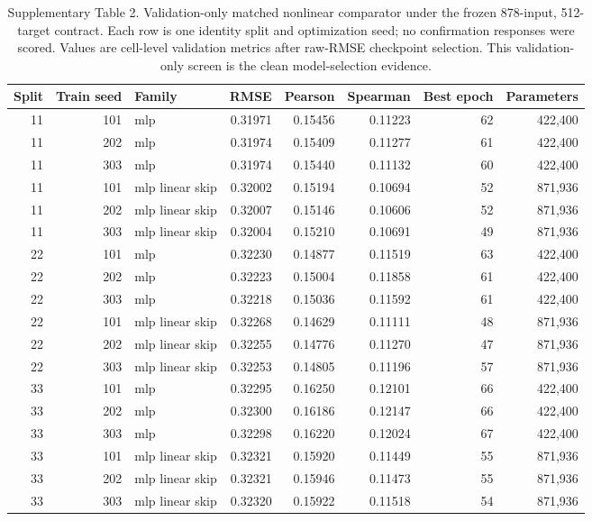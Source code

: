 \begin{table}[ht]\centering\scriptsize\caption{Supplementary Table 2. Validation-only matched nonlinear comparator under the frozen 878-input, 512-target contract. Each row is one identity split and optimization seed; no confirmation responses were scored. Values are cell-level validation metrics after raw-RMSE checkpoint selection. This validation-only screen is the clean model-selection evidence.}\label{tab:matched_nonlinear}\begin{tabular}{rrlrrrrr}\toprule Split & Train seed & Family & RMSE & Pearson & Spearman & Best epoch & Parameters \\ \midrule
11 & 101 & mlp & 0.31971 & 0.15456 & 0.11223 & 62 & 422,400 \\
11 & 202 & mlp & 0.31974 & 0.15409 & 0.11277 & 61 & 422,400 \\
11 & 303 & mlp & 0.31974 & 0.15440 & 0.11132 & 60 & 422,400 \\
11 & 101 & mlp linear skip & 0.32002 & 0.15194 & 0.10694 & 52 & 871,936 \\
11 & 202 & mlp linear skip & 0.32007 & 0.15146 & 0.10606 & 52 & 871,936 \\
11 & 303 & mlp linear skip & 0.32004 & 0.15210 & 0.10691 & 49 & 871,936 \\
22 & 101 & mlp & 0.32230 & 0.14877 & 0.11519 & 63 & 422,400 \\
22 & 202 & mlp & 0.32223 & 0.15004 & 0.11858 & 61 & 422,400 \\
22 & 303 & mlp & 0.32218 & 0.15036 & 0.11592 & 61 & 422,400 \\
22 & 101 & mlp linear skip & 0.32268 & 0.14629 & 0.11111 & 48 & 871,936 \\
22 & 202 & mlp linear skip & 0.32255 & 0.14776 & 0.11270 & 47 & 871,936 \\
22 & 303 & mlp linear skip & 0.32253 & 0.14805 & 0.11196 & 57 & 871,936 \\
33 & 101 & mlp & 0.32295 & 0.16250 & 0.12101 & 66 & 422,400 \\
33 & 202 & mlp & 0.32300 & 0.16186 & 0.12147 & 66 & 422,400 \\
33 & 303 & mlp & 0.32298 & 0.16220 & 0.12024 & 67 & 422,400 \\
33 & 101 & mlp linear skip & 0.32321 & 0.15920 & 0.11449 & 55 & 871,936 \\
33 & 202 & mlp linear skip & 0.32321 & 0.15946 & 0.11473 & 55 & 871,936 \\
33 & 303 & mlp linear skip & 0.32320 & 0.15922 & 0.11518 & 54 & 871,936 \\

\end{tabular}
\end{table}
